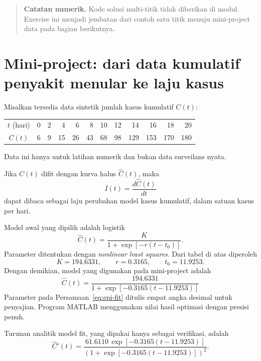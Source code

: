 \documentclass[book,english,noindex,lean,nobackpage,nocopyright,noupdate,nofiglist,notablist]{enacom}
\newcommand{\Note}[1]{\begin{quote}\textbf{Catatan numerik.} #1\end{quote}}
\begin{document}
\Note{Kode solusi multi-titik tidak diberikan di modul. Exercise ini menjadi jembatan dari contoh
satu titik menuju mini-project data pada bagian berikutnya.}


\section{Mini-project: dari data kumulatif penyakit menular ke laju kasus}
Misalkan tersedia data sintetik jumlah kasus kumulatif $C(t)$:
\begin{center}
\renewcommand{\arraystretch}{1.08}
\begin{tabular}{c|rrrrrrrrrrr}
\hline
$t$ (hari) & 0&2&4&6&8&10&12&14&16&18&20\\
$C(t)$ & 6&9&15&26&43&68&98&129&153&170&180\\
\hline
\end{tabular}
\end{center}
Data ini hanya untuk latihan numerik dan bukan data surveilans nyata.

Jika $C(t)$ difit dengan kurva halus $\widehat C(t)$, maka
\begin{equation}
I(t)=\frac{d\widehat C(t)}{dt}
\label{eq:incidence-rate}
\end{equation}
dapat dibaca sebagai laju perubahan model kasus kumulatif, dalam satuan kasus per hari.

Model awal yang dipilih adalah logistik
\begin{equation}
\widehat C(t)=\frac{K}{1+\exp[-r(t-t_0)]}.
\label{eq:logistic-general}
\end{equation}
Parameter ditentukan dengan \textit{nonlinear least squares}. Dari tabel di atas diperoleh
\[
K=194.6331,\qquad r=0.3165,\qquad t_0=11.9253.
\]
Dengan demikian, model yang digunakan pada mini-project adalah
\begin{equation}
\boxed{
\widehat C(t)=
\frac{194.6331}
{1+\exp[-0.3165(t-11.9253)]}
}
\label{eq:epi-fit}
\end{equation}
Parameter pada Persamaan~\eqref{eq:epi-fit} ditulis empat angka desimal untuk penyajian. Program MATLAB menggunakan nilai hasil optimasi dengan presisi penuh.

Turunan analitik model fit, yang dipakai hanya sebagai verifikasi, adalah
\begin{equation}
\widehat C'(t)=
\frac{61.6110\,\exp[-0.3165(t-11.9253)]}
{\left(1+\exp[-0.3165(t-11.9253)]\right)^2}.
\label{eq:epi-derivative}
\end{equation}
\end{document}
